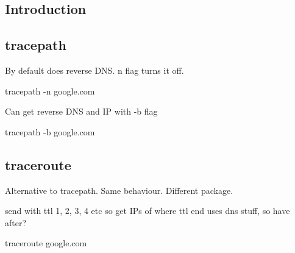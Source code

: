 
\subsection{Introduction}

\subsection{tracepath}

By default does reverse DNS. n flag turns it off.

tracepath -n google.com

Can get reverse DNS and IP with -b flag

tracepath -b google.com

\subsection{traceroute}

Alternative to tracepath. Same behaviour. Different package.

send with ttl 1, 2, 3, 4 etc so get IPs of where ttl end
uses dns stuff, so have after?

traceroute google.com
